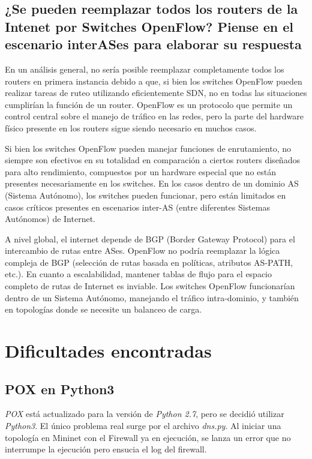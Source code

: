 \subsection{¿Se pueden reemplazar todos los routers de la Intenet por Switches OpenFlow? Piense en el escenario interASes para elaborar su respuesta} 

En un análisis general, no sería posible reemplazar completamente todos los routers en primera instancia debido a que,
si bien los switches OpenFlow pueden realizar tareas de ruteo utilizando eficientemente SDN, no en todas las situaciones
cumplirían la función de un router. OpenFlow es un protocolo que permite un control central sobre el manejo de tráfico
en las redes, pero la parte del hardware físico presente en los routers sigue siendo necesario en muchos casos.

\vspace{0.25cm}

Si bien los switches OpenFlow pueden manejar funciones de enrutamiento, no siempre son efectivos en su totalidad en
comparación a ciertos routers diseñados para alto rendimiento, compuestos por un hardware especial que no están
presentes necesariamente en los switches. En los casos dentro de un dominio AS (Sistema Autónomo), los switches pueden
funcionar, pero están limitados en casos críticos presentes en escenarios inter-AS (entre diferentes Sistemas Autónomos)
de Internet.

\vspace{0.25cm}

A nivel global, el internet depende de BGP (Border Gateway Protocol) para el intercambio de rutas entre ASes. OpenFlow
no podría reemplazar la lógica compleja de BGP (selección de rutas basada en políticas, atributos AS-PATH, etc.). En
cuanto a escalabilidad, mantener tablas de flujo para el espacio completo de rutas de Internet es inviable. Los switches
OpenFlow funcionarían dentro de un Sistema Autónomo, manejando el tráfico intra-dominio, y también en topologías donde
se necesite un balanceo de carga.

\section{Dificultades encontradas} \label{sec:section9}
\subsection{POX en Python3} \label{subsec:python3}

\textit{POX} está actualizado para la versión de \textit{Python 2.7}, pero se decidió utilizar \textit{Python3}. El único problema real surge por el archivo \textit{dns.py}. Al iniciar una topología en Mininet con el Firewall ya en ejecución, se lanza un error que no interrumpe la ejecución pero ensucia el log del firewall.


